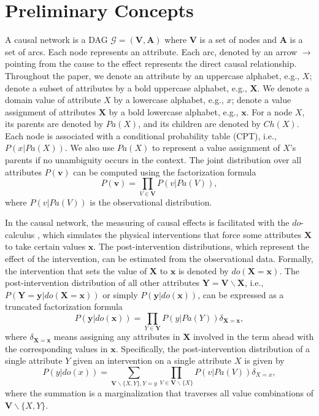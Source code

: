 \documentclass[letterpaper]{article}
\begin{document}

\section{Preliminary Concepts}

A causal network is a DAG $\mathcal{G}=(\mathbf{V},\mathbf{A})$ where $\mathbf{V}$ is a set of nodes and $\mathbf{A}$ is a set of arcs. Each node represents an attribute. Each arc, denoted by an arrow $\rightarrow$ pointing from the cause to the effect represents the direct causal relationship. Throughout the paper, we denote an attribute by an uppercase alphabet, e.g., $X$; denote a subset of attributes by a bold uppercase alphabet, e.g., $\mathbf{X}$. We denote a domain value of attribute $X$ by a lowercase alphabet, e.g., $x$; denote a value assignment of attributes $\mathbf{X}$ by a bold lowercase alphabet, e.g., $\mathbf{x}$. For a node $X$, its parents are denoted by $Pa(X)$, and its children are denoted by $Ch(X)$. Each node is associated with a conditional probability table (CPT), i.e., $P(x|Pa(X))$. We also use $Pa(X)$ to represent a value assignment of $X$'s parents if no unambiguity occurs in the context. The joint distribution over all attributes $P(\mathbf{v})$ can be computed using the factorization formula \cite{koller2009probabilistic}
\begin{equation}\label{eq:bn}
P(\mathbf{v}) = \prod_{V\in \mathbf{V}}P(v|Pa(V)),
\end{equation}
where $P(v|Pa(V))$ is the observational distribution.

In the causal network, the measuring of causal effects is facilitated with the $do$-calculus \cite{pearl2009causality}, which simulates the physical interventions that force some attributes $\mathbf{X}$ to take certain values $\mathbf{x}$. The post-intervention distributions, which represent the effect of the intervention, can be estimated from the observational data. Formally, the intervention that sets the value of $\mathbf{X}$ to $\mathbf{x}$ is denoted by $do(\mathbf{X} = \mathbf{x})$. The post-intervention distribution of all other attributes $\mathbf{Y}=\mathbf{V}\backslash \mathbf{X}$, i.e., $P(\mathbf{Y}=\mathbf{y}|do(\mathbf{X}=\mathbf{x}))$ or simply $P(\mathbf{y}|do(\mathbf{x}))$, can be expressed as a truncated factorization formula \cite{pearl2009causality}
\begin{equation*}
P(\mathbf{y}|do(\mathbf{x})) = \prod_{Y\in \mathbf{Y}}P(y|Pa(Y))\delta_{\mathbf{X}=\mathbf{x}},
\end{equation*}
where $\delta_{\mathbf{X}=\mathbf{x}}$ means assigning any attributes in $\mathbf{X}$ involved in the term ahead with the corresponding values in $\mathbf{x}$. Specifically, the post-intervention distribution of a single attribute $Y$ given an intervention on a single attribute $X$ is given by
\begin{equation}\label{eq:do}
P(y|do(x)) = \sum_{\mathbf{V}\backslash \{X,Y\},Y=y}\prod_{V\in \mathbf{V}\backslash \{X\}}P(v|Pa(V))\delta_{X=x},
\end{equation}
where the summation is a marginalization that traverses all value combinations of $\mathbf{V}\backslash \{X,Y\}$. 
\end{document}
